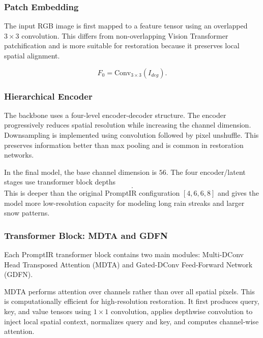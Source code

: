 \documentclass[10pt,conference]{article}
\begin{document}
\subsubsection{Patch Embedding}

The input RGB image is first mapped to a feature tensor using an overlapped $3\times3$ convolution. This differs from non-overlapping Vision Transformer patchification and is more suitable for restoration because it preserves local spatial alignment.

\begin{equation}
    F_0 = \mathrm{Conv}_{3\times3}(I_{deg}).
\end{equation}

\subsubsection{Hierarchical Encoder}

The backbone uses a four-level encoder-decoder structure. The encoder progressively reduces spatial resolution while increasing the channel dimension. Downsampling is implemented using convolution followed by pixel unshuffle. This preserves information better than max pooling and is common in restoration networks.

In the final model, the base channel dimension is $56$. The four encoder/latent stages use transformer block depths
\begin{equation}
    [4,6,8,12].
\end{equation}
This is deeper than the original PromptIR configuration $[4,6,6,8]$ and gives the model more low-resolution capacity for modeling long rain streaks and larger snow patterns.

\subsubsection{Transformer Block: MDTA and GDFN}

Each PromptIR transformer block contains two main modules: Multi-DConv Head Transposed Attention (MDTA) and Gated-DConv Feed-Forward Network (GDFN).

MDTA performs attention over channels rather than over all spatial pixels. This is computationally efficient for high-resolution restoration. It first produces query, key, and value tensors using $1\times1$ convolution, applies depthwise convolution to inject local spatial context, normalizes query and key, and computes channel-wise attention.
\end{document}
